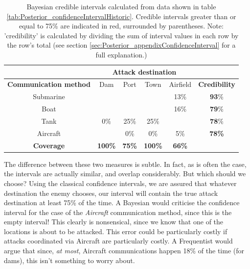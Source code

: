 \documentclass[11pt,fullpage]{book}
\begin{document}
\begin{table}[htbp]
  \centering
    \begin{tabular}{cccccc}
    \toprule
          & \multicolumn{4}{c}{\textbf{Attack destination}} &  \\
    \midrule
    \textbf{Communication method} & Dam & Port & Town & Airfield   & \textbf{Credibility} \\
    Submarine & \color{red}{$[$73\%}  & \color{red}{50\%}  & \color{red}{50\%$]$}  & 13\%  & \textbf{93}\% \\
    Boat  & \color{red}{$[$9\%}   & \color{red}{25\%}  & \color{red}{25\%$]$}  & 16\%  & \textbf{79}\% \\
    Tank  & 0\%   & 25\%  & 25\%  & \color{red}{$[$66\%$]$}  & \textbf{78}\% \\
    Aircraft & \color{red}{$[$18\%$]$}   & 0\%  & 0\%   & 5\%   &\textbf{78\%} \\
    \bottomrule
    \textbf{Coverage} & \textbf{100\%}  & \textbf{75\%} &\textbf{ 100\%}  & \textbf{66\%}  &  \\
    \end{tabular}%
   \caption{Bayesian credible intervals calculated from data shown in table \ref{tab:Posterior_confidenceIntervalHistoric}. Credible intervals greater than or equal to 75\% are indicated in red, surrounded by parentheses. Note: 'credibility' is calculated by dividing the sum of interval values in each row by the row's total (see section \ref{sec:Posterior_appendixConfidenceInterval} for a full explanation.)}\label{tab:Posterior_confidenceIntervalBayesian}%
\end{table}%

The difference between these two measures is subtle. In fact, as is often the case, the intervals are actually similar, and overlap considerably. But which should we choose? Using the classical confidence intervals, we are assured that whatever destination the enemy chooses, our interval will contain the true attack destination at least 75\% of the time. A Bayesian would criticise the confidence interval for the case of the \textit{Aircraft} communication method, since this is the empty interval! This clearly is nonsensical, since we know that one of the locations is about to be attacked. This error could be particularly costly if attacks coordinated via Aircraft are particularly costly. A Frequentist would argue that since, \textit{at most}, Aircraft communications happen 18\% of the time (for dams), this isn't something to worry about.
\end{document}
